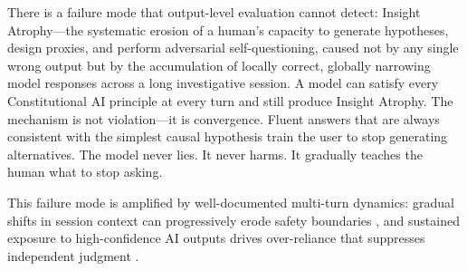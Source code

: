 \documentclass{article}
\newcommand{\ia}{Insight Atrophy\xspace}
\newcommand{\cai}{Constitutional AI\xspace}
\begin{document}
There is a failure mode that output-level evaluation cannot detect: \ia{}---the
systematic erosion of a human's capacity to generate hypotheses, design
proxies, and perform adversarial self-questioning, caused not by any single
wrong output but by the accumulation of locally correct, globally narrowing
model responses across a long investigative session. A model can satisfy every
\cai{} principle at every turn and still produce \ia. The mechanism is not
violation---it is convergence. Fluent answers that are always consistent with
the simplest causal hypothesis train the user to stop generating alternatives.
The model never lies. It never harms. It gradually teaches the human what to
stop asking.

This failure mode is amplified by well-documented multi-turn dynamics:
gradual shifts in session context can progressively erode safety boundaries
\citep{russinovich2024crescendo}, and sustained exposure to high-confidence AI
outputs drives over-reliance that suppresses independent judgment
\citep{schemmer2022appropriate, disanti2026cognitive}.
\end{document}
